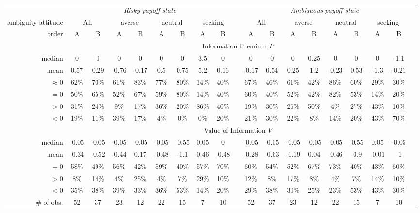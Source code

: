 \begin{tabular}{ r c c c c c c c c c c c c c c c c c c }
\toprule 
& \multicolumn{8}{c}{\it Risky payoff state} & & \multicolumn{8}{c}{\it Ambiguous payoff state}\\
\cmidrule[\mrw](lr){2-9} \cmidrule[\mrw](lr){11-18}
ambiguity attitude & \multicolumn{2}{c}{All} & \multicolumn{2}{c}{averse} & \multicolumn{2}{c}{neutral} & \multicolumn{2}{c}{seeking} & & \multicolumn{2}{c}{All} & \multicolumn{2}{c}{averse} & \multicolumn{2}{c}{neutral} & \multicolumn{2}{c}{seeking}\\
\cmidrule[\mrw](lr){2-3} \cmidrule[\mrw](lr){4-5} \cmidrule[\mrw](lr){6-7} \cmidrule[\mrw](lr){8-9}\cmidrule[\mrw](lr){11-12} \cmidrule[\mrw](lr){13-14} \cmidrule[\mrw](lr){15-16} \cmidrule[\mrw](lr){17-18}
order & A & B & A & B & A & B & A & B & & A & B & A & B & A & B & A & B\\
\midrule[\mrw] 
& \multicolumn{17}{c}{Information Premium $P$}\\ 
\midrule[\mrw] 
median & 0 & 0 & 0 & 0 & 0 & 0 & 3.5 & 0 &  & 0 & 0 & 0 & 0.25 & 0 & 0 & 0 & -1.1 \\
mean & 0.57 & 0.29 & -0.76 & -0.17 & 0.5 & 0.75 & 5.2 & 0.16 &  & -0.17 & 0.54 & 0.25 & 1.2 & -0.23 & 0.53 & -1.3 & -0.21 \\
$\approx 0$ & 62\% & 70\% & 61\% & 83\% & 77\% & 80\% & 14\% & 40\% &  & 67\% & 46\% & 61\% & 42\% & 86\% & 60\% & 29\% & 30\% \\
$=0$ & 50\% & 65\% & 52\% & 67\% & 59\% & 80\% & 14\% & 40\% &  & 60\% & 40\% & 52\% & 42\% & 82\% & 53\% & 14\% & 20\% \\
$>0$ & 31\% & 24\% & 9\% & 17\% & 36\% & 20\% & 86\% & 40\% &  & 19\% & 30\% & 26\% & 50\% & 4\% & 27\% & 43\% & 10\% \\
$<0$ & 19\% & 11\% & 39\% & 17\% & 4\% & 0\% & 0\% & 20\% &  & 21\% & 30\% & 22\% & 8\% & 14\% & 20\% & 43\% & 70\% \\
\midrule[\mrw] 
& \multicolumn{17}{c}{Value of Information $V$}\\ 
\midrule[\mrw] 
median & -0.05 & -0.05 & -0.05 & -0.05 & -0.05 & -0.55 & 0.05 & 0 &  & -0.05 & -0.05 & -0.05 & -0.05 & -0.05 & -0.55 & 0.05 & -0.05 \\
mean & -0.34 & -0.52 & -0.44 & 0.17 & -0.48 & -1.1 & 0.46 & -0.48 &  & -0.28 & -0.63 & -0.19 & 0.04 & -0.46 & -0.9 & -0.01 & -1 \\
$=0$ & 58\% & 49\% & 56\% & 42\% & 59\% & 40\% & 57\% & 70\% &  & 60\% & 54\% & 52\% & 67\% & 73\% & 40\% & 43\% & 60\% \\
$>0$ & 8\% & 14\% & 4\% & 25\% & 4\% & 7\% & 29\% & 10\% &  & 12\% & 8\% & 17\% & 8\% & 4\% & 7\% & 14\% & 10\% \\
$<0$ & 35\% & 38\% & 39\% & 33\% & 36\% & 53\% & 14\% & 20\% &  & 29\% & 38\% & 30\% & 25\% & 23\% & 53\% & 43\% & 30\% \\
\midrule[\mrw] 
\# of obs. & 52 & 37 & 23 & 12 & 22 & 15 & 7 & 10 &  & 52 & 37 & 23 & 12 & 22 & 15 & 7 & 10 \\
\bottomrule 
 \end{tabular}